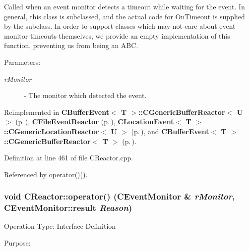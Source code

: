Called when an event monitor detects a timeout while waiting for the event. In general, this class is subclassed, and the actual code for On\-Timeout is supplied by the subclass. In order to support classes which may not care about event monitor timeouts themselves,  we provide an empty implementation of this function, preventing us from being an ABC.\begin{Desc}
\item[Parameters: ]\par
\begin{description}
\item[{\em 
r\-Monitor}]- The monitor which detected the event. \end{description}
\end{Desc}


Reimplemented in {\bf CBuffer\-Event$<$ T $>$::CGeneric\-Buffer\-Reactor$<$ U $>$} {\rm (p.\,\pageref{classCBufferEvent_1_1CGenericBufferReactor_a2})}, {\bf CFile\-Event\-Reactor} {\rm (p.\,\pageref{classCFileEvent_1_1CFileEventReactor_a5})}, {\bf CLocation\-Event$<$ T $>$::CGeneric\-Location\-Reactor$<$ U $>$} {\rm (p.\,\pageref{classCLocationEvent_1_1CGenericLocationReactor_a2})}, and {\bf CBuffer\-Event$<$ T $>$::CGeneric\-Buffer\-Reactor$<$ T $>$} {\rm (p.\,\pageref{classCBufferEvent_1_1CGenericBufferReactor_a2})}.

Definition at line 461 of file CReactor.cpp.

Referenced by operator()().
\subsubsection{\setlength{\rightskip}{0pt plus 5cm}void CReactor::operator() ({\bf CEvent\-Monitor} \& {\em r\-Monitor}, {\bf CEvent\-Monitor::result} {\em Reason})\hspace{0.3cm}{\tt  [virtual]}}\label{classCReactor_a5}


Operation Type: Interface Definition

Purpose:

